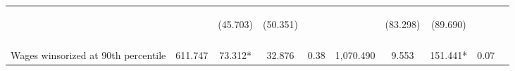 \begin{tabular}{lccccccccc}
 & \begin{footnotesize}\end{footnotesize} & \begin{footnotesize}(45.703)\end{footnotesize} & \begin{footnotesize}(50.351)\end{footnotesize} & \begin{footnotesize}\end{footnotesize} & \begin{footnotesize}\end{footnotesize} & \begin{footnotesize}(83.298)\end{footnotesize} & \begin{footnotesize}(89.690)\end{footnotesize} & \begin{footnotesize}\end{footnotesize} & \begin{footnotesize}\end{footnotesize}\\
 & \begin{footnotesize}\end{footnotesize} & \begin{footnotesize}[0.224]\end{footnotesize} & \begin{footnotesize}[1.000]\end{footnotesize} & \begin{footnotesize}\end{footnotesize} & \begin{footnotesize}\end{footnotesize} & \begin{footnotesize}[1.000]\end{footnotesize} & \begin{footnotesize}[0.031]\end{footnotesize} & \begin{footnotesize}\end{footnotesize} & \begin{footnotesize}\end{footnotesize}\\
\noalign{\smallskip}Wages winsorized at 90th percentile & 611.747 & 73.312* & 32.876 & 0.38 & 1,070.490 & 9.553 & 151.441* & 0.07 & \\

\end{tabular}
